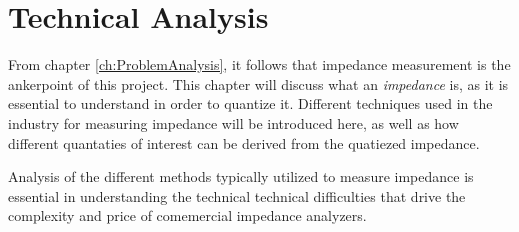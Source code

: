 \chapter{Technical Analysis} \label{ch:TechnicalAnalysis}
From chapter \ref{ch:ProblemAnalysis}, it follows that impedance measurement is the ankerpoint of this project. This chapter will discuss what an \textit{impedance} is, as it is essential to understand in order to quantize it. Different techniques used in the industry for measuring impedance will be introduced here, as well as how different quantaties of interest can be derived from the quatiezed impedance. 

Analysis of the different methods typically utilized to measure impedance is essential in understanding the technical technical difficulties that drive the complexity and price of comemercial impedance analyzers.

